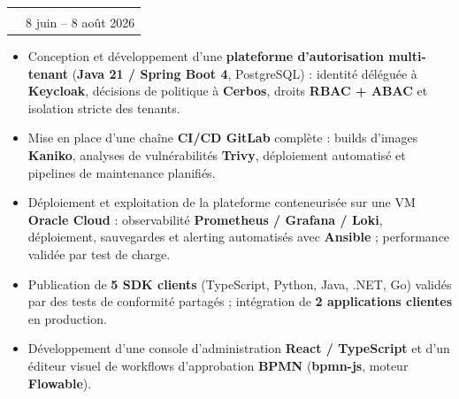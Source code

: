 \documentclass[a4paper,11pt]{article}
\makeatletter
\newif\ifenglish
\newcommand{\freng}[2]{%
  \ifenglish
    #2%
  \else
    #1%
  \fi
}
\newcommand{\resumeSubheading}[4]{
\vspace{0.5mm}\item
    \begin{tabular*}{0.98\textwidth}[t]{l@{\extracolsep{\fill}}r}
        \textbf{#1} & \textit{\footnotesize{#4}} \\
        \textit{\footnotesize{#3}} &  \footnotesize{#2}\\
    \end{tabular*}
    \vspace{-2.4mm}
}
\newcommand{\resumeItemListStart}{\begin{itemize}[leftmargin=*,labelsep=1mm,itemsep=0.5mm]}
\newcommand{\resumeItemListEnd}{\end{itemize}\vspace{-2mm}}
\makeatother
\begin{document}
\resumeSubheading
  {SYNERTIC — \freng{Casablanca, Maroc}{Casablanca, Morocco}}
  {\freng{8 juin – 8 août 2026}{June 8 – August 8, 2026}}
  {\freng
    {Stagiaire Ingénieur Backend \& DevOps — Auth-Service, plateforme SaaS multi-tenant}
    {Backend \& DevOps Engineering Intern — Auth-Service, multi-tenant SaaS platform}}
  {\freng{Stage de 2 mois}{2-month internship}}
  \vspace{0.5mm}
  \resumeItemListStart
    \item
    \freng
    {
    Conception et développement d'une \textbf{plateforme d'autorisation multi-tenant} (\textbf{Java 21 / Spring Boot 4}, PostgreSQL) : identité déléguée à \textbf{Keycloak}, décisions de politique à \textbf{Cerbos}, droits \textbf{RBAC + ABAC} et isolation stricte des tenants.
    }
    {
    Designed and built a \textbf{multi-tenant authorization platform} (\textbf{Java 21 / Spring Boot 4}, PostgreSQL): identity delegated to \textbf{Keycloak}, policy decisions to \textbf{Cerbos}, \textbf{RBAC + ABAC} permissions and strict tenant isolation.
    }
    \item
    \freng
    {
    Mise en place d'une chaîne \textbf{CI/CD GitLab} complète : builds d'images \textbf{Kaniko}, analyses de vulnérabilités \textbf{Trivy}, déploiement automatisé et pipelines de maintenance planifiés.
    }
    {
    Built a complete \textbf{GitLab CI/CD} pipeline: \textbf{Kaniko} image builds, \textbf{Trivy} vulnerability scans , automated deployment and scheduled maintenance pipelines.
    }
    \item
    \freng
    {
    Déploiement et exploitation de la plateforme conteneurisée sur une VM \textbf{Oracle Cloud} : observabilité \textbf{Prometheus / Grafana / Loki}, déploiement, sauvegardes et alerting automatisés avec \textbf{Ansible} ; performance validée par test de charge.
    }
    {
    Deployed and operated the containerized platform on an \textbf{Oracle Cloud} VM: \textbf{Prometheus / Grafana / Loki} observability, deployment, backups and alerting automated with \textbf{Ansible}; performance validated by load testing.
    }
    \item
    \freng
    {
    Publication de \textbf{5 SDK clients} (TypeScript, Python, Java, .NET, Go) validés par des tests de conformité partagés ; intégration de \textbf{2 applications clientes} en production.
    }
    {
    Published \textbf{5 client SDKs} (TypeScript, Python, Java, .NET, Go) validated by shared conformance tests; integrated \textbf{2 client applications} into production.
    }
    \item
    \freng
    {
    Développement d'une console d'administration \textbf{React / TypeScript} et d'un éditeur visuel de workflows d'approbation \textbf{BPMN} (\textbf{bpmn-js}, moteur \textbf{Flowable}).
    }
    {
    Built a \textbf{React / TypeScript} admin console and a visual \textbf{BPMN} approval-workflow editor (\textbf{bpmn-js}, \textbf{Flowable} engine).
    }
  \resumeItemListEnd
\end{document}
